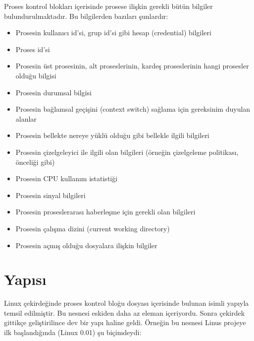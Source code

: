 \documentclass[a4paper,10pt,turkish]{sphinxmanual}
\begin{document}
\sphinxAtStartPar
Proses kontrol blokları içerisinde prosese ilişkin gerekli bütün bilgiler bulundurulmaktadır. Bu
bilgilerden bazıları şunlardır:
\begin{itemize}
\item {} 
\sphinxAtStartPar
Prosesin kullanıcı id’si, grup id’si gibi hesap (credential) bilgileri

\item {} 
\sphinxAtStartPar
Proses id’si

\item {} 
\sphinxAtStartPar
Prosesin üst prosesinin, alt proseslerinin, kardeş proseslerinin hangi prosesler olduğu bilgisi

\item {} 
\sphinxAtStartPar
Prosesin durumsal bilgisi

\item {} 
\sphinxAtStartPar
Prosesin bağlamsal geçişini (context switch) sağlama için gereksinim duyulan alanlar

\item {} 
\sphinxAtStartPar
Prosesin bellekte nereye yüklü olduğu gibi bellekle ilgili bilgileri

\item {} 
\sphinxAtStartPar
Prosesin çizelgeleyici ile ilgili olan bilgileri (örneğin çizelgeleme politikası, önceliği gibi)

\item {} 
\sphinxAtStartPar
Prosesin CPU kullanım istatistiği

\item {} 
\sphinxAtStartPar
Prosesin sinyal bilgileri

\item {} 
\sphinxAtStartPar
Prosesin proseslerarası haberleşme için gerekli olan bilgileri

\item {} 
\sphinxAtStartPar
Prosesin çalışma dizini (current working directory)

\item {} 
\sphinxAtStartPar
Prosesin açmış olduğu dosyalara ilişkin bilgiler

\end{itemize}


\section{ Yapısı}
\label{\detokenize{processcontrolblock:task-struct-yapisi}}
\sphinxAtStartPar
Linux çekirdeğinde proses kontrol bloğu  dosyası içerisinde bulunan
 isimli yapıyla temsil edilmiştir. Bu  nesnesi eskiden daha az eleman
içeriyordu. Sonra çekirdek gittikçe geliştirilince dev bir yapı haline geldi. Örneğin bu 
nesnesi Linus projeye ilk başlandığında (Linux 0.01) şu biçimdeydi:
\end{document}
